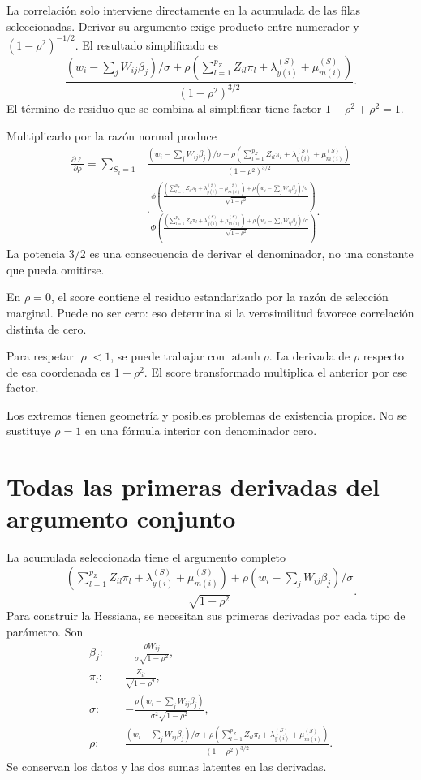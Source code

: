 \documentclass[11pt,a4paper]{article}
\begin{document}
La correlación solo interviene
directamente en la acumulada
de las filas seleccionadas.
Derivar su argumento exige
producto entre numerador y
\((1-\rho^2)^{-1/2}\).
El resultado simplificado es
\[
\frac{
(w_i-\sum_jW_{ij}\beta_j)/\sigma+
\rho\left(\sum_{l=1}^{p_Z}Z_{il}\pi_l+\lambda_{y(i)}^{(S)}+\mu_{m(i)}^{(S)}\right)
}{(1-\rho^2)^{3/2}}.
\]
El término de residuo
que se combina al simplificar
tiene factor \(1-\rho^2+\rho^2=1\).

Multiplicarlo por la
razón normal produce
\[
\begin{aligned}
\frac{\partial\ell}{\partial\rho}
=\sum_{S_i=1}
&\frac{
(w_i-\sum_jW_{ij}\beta_j)/\sigma+
\rho\left(\sum_{l=1}^{p_Z}Z_{il}\pi_l+\lambda_{y(i)}^{(S)}+\mu_{m(i)}^{(S)}\right)
}{(1-\rho^2)^{3/2}}\\
&\cdot
\frac{
\phi\left(\frac{\left(\sum_{l=1}^{p_Z}Z_{il}\pi_l+\lambda_{y(i)}^{(S)}+\mu_{m(i)}^{(S)}\right)+
\rho(w_i-\sum_jW_{ij}\beta_j)/\sigma}{\sqrt{1-\rho^2}}\right)}
{\Phi\left(\frac{\left(\sum_{l=1}^{p_Z}Z_{il}\pi_l+\lambda_{y(i)}^{(S)}+\mu_{m(i)}^{(S)}\right)+
\rho(w_i-\sum_jW_{ij}\beta_j)/\sigma}{\sqrt{1-\rho^2}}\right)}.
\end{aligned}
\]
La potencia \(3/2\)
es una consecuencia
de derivar el denominador,
no una constante que
pueda omitirse.

\begin{ejemplo}
En \(\rho=0\), el
score contiene el residuo
estandarizado por la
razón de selección marginal.
Puede no ser cero:
eso determina si
la verosimilitud favorece
correlación distinta de cero.
\end{ejemplo}
Para respetar \(|\rho|<1\),
se puede trabajar con
\(\operatorname{atanh}\rho\).
La derivada de \(\rho\)
respecto de esa coordenada
es \(1-\rho^2\).
El score transformado
multiplica el anterior
por ese factor.

Los extremos tienen geometría
y posibles problemas de
existencia propios.
No se sustituye \(\rho=1\)
en una fórmula interior
con denominador cero.


\clearpage
\section{Todas las primeras derivadas del argumento conjunto}

La acumulada seleccionada tiene
el argumento completo
\[
\frac{\left(\sum_{l=1}^{p_Z}Z_{il}\pi_l+\lambda_{y(i)}^{(S)}+\mu_{m(i)}^{(S)}\right)+
\rho(w_i-\sum_jW_{ij}\beta_j)/\sigma}
{\sqrt{1-\rho^2}}.
\]
Para construir la Hessiana,
se necesitan sus primeras
derivadas por cada tipo
de parámetro. Son
\[
\begin{aligned}
\beta_j:\quad&
-\frac{\rho W_{ij}}{\sigma\sqrt{1-\rho^2}},\\
\pi_l:\quad&
\frac{Z_{il}}{\sqrt{1-\rho^2}},\\
\sigma:\quad&
-\frac{\rho(w_i-\sum_jW_{ij}\beta_j)}
{\sigma^2\sqrt{1-\rho^2}},\\
\rho:\quad&
\frac{(w_i-\sum_jW_{ij}\beta_j)/\sigma+
\rho\left(\sum_{l=1}^{p_Z}Z_{il}\pi_l+\lambda_{y(i)}^{(S)}+\mu_{m(i)}^{(S)}\right)}{(1-\rho^2)^{3/2}}.
\end{aligned}
\]
Se conservan los datos
y las dos sumas latentes
en las derivadas.
\end{document}
